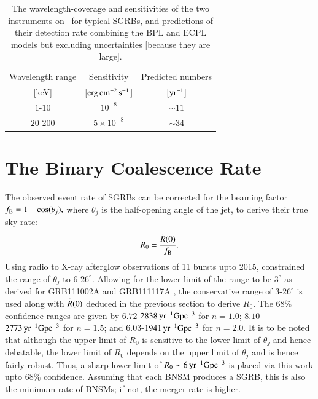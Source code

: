 \begin{table}
\caption[Specifications and short GRB detections estimates for \D]{The wavelength-coverage and sensitivities of the two instruments on \D\ for typical SGRBs, and predictions of their detection rate combining the BPL and ECPL models but excluding uncertainties [because they are large].}
\label{tab:predictions_for_Daksha--short}
\begin{center}
\begin{tabular}{|c|c|c|}
\hline 
Wavelength range & Sensitivity & Predicted numbers\\
 {[keV]} & [$\rm erg \, cm^{-2} \, s^{-1}$] & [${\rm yr^{-1}}$]\\
\hline
\hline
$1$-$10$ & $10^{-8}$ & $\sim 11$\\
\hline
$20$-$200$ & $5 \times 10^{-8}$ & $\sim 34$\\
\hline
\end{tabular}
\end{center}
\end{table}



\section{The Binary Coalescence Rate}
\label{sec:Events_rate}
The observed event rate of SGRBs can be corrected for the beaming factor $ f_{\rm{B}} = 1 - \cos(\theta_j), $ where $ \theta_j $ is the half-opening angle of the jet, to derive their true sky rate:
\begin{equation}
R_0 = \dfrac{ \overset{.}{R}(0) }{f_{\rm{B}}}.
\end{equation} Using radio to X-ray afterglow observations of 11 bursts upto 2015, \cite{Fong_et_al.-2015-ApJ} constrained the range of $\theta_j$ to $6$-$26^{\circ}.$ Allowing for the lower limit of the range to be $3^{\circ}$ as derived for GRB111002A \citep{Fong_et_al.-2012-ApJ} and GRB111117A \citep{Margutti_et_al.-2012-ApJ}, the conservative range of $3$-$26^{\circ}$ is used along with $\overset{.}{R}(0)$ deduced in the previous section to derive $R_0$. The $68 \%$ confidence ranges are given by $6.72$-$2838 \, {\rm yr^{-1}Gpc^{-3}} $ for $n = 1.0$; $8.10$-$2773 \, {\rm yr^{-1}Gpc^{-3}}$ for $n = 1.5$; and $6.03$-$1941 \, {\rm yr^{-1}Gpc^{-3}} $ for $n = 2.0$. It is to be noted that although the upper limit of $R_0$ is sensitive to the lower limit of $\theta_j$ and hence debatable, the lower limit of $R_0$ depends on the upper limit of $\theta_j$ and is hence fairly robust. Thus, a sharp lower limit of $R_0 \sim 6 \, {\rm yr^{-1}Gpc^{-3}}$ is placed via this work upto $68 \%$ confidence. Assuming that each BNSM produces a SGRB, this is also the minimum rate of BNSMs; if not, the merger rate is higher.


